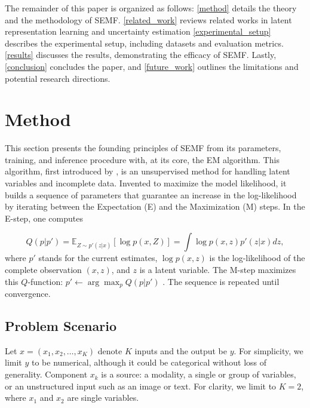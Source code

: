 \documentclass{article}
\begin{document}
The remainder of this paper is organized as follows: \autoref{method} details the theory and the methodology of SEMF. \autoref{related_work} reviews related works in latent representation learning and uncertainty estimation
\autoref{experimental_setup} describes the experimental setup, including datasets and evaluation metrics. \autoref{results} discusses the results, demonstrating the efficacy of SEMF. Lastly, \autoref{conclusion} concludes the paper, and \autoref{future_work} outlines the limitations and potential research directions.

\section{Method}
\label{method}
This section presents the founding principles of SEMF from its parameters, training, and inference procedure with, at its core, the EM algorithm. This algorithm, first introduced by \cite{Dempster1977}, is an unsupervised method for handling latent variables and incomplete data. Invented to maximize the model likelihood, it builds a sequence of parameters that guarantee an increase in the log-likelihood \cite{wu1983convergence} by iterating between the Expectation (E) and the Maximization (M) steps. In the E-step, one computes

\begin{equation}
\label{eqn:em_e_step}
Q(p | p') = \mathbb{E}_{Z \sim p'(z| x)}\left[ \log p(x, Z) \right] = \int \log p(x,z) p'(z|x) dz,
\end{equation}
where \( p' \) stands for the current estimates, \( \log p(x, z) \) is the log-likelihood of the complete observation $(x,z)$, and \( z \) is a latent variable. The M-step maximizes this $Q$-function: $p' \leftarrow \arg\max_p Q(p | p')$ . The sequence is repeated until convergence.

\subsection{Problem Scenario}
Let $x=(x_1, x_2, \ldots, x_K)$ denote $K$ inputs and the output be $y$. For simplicity, we limit $y$ to be numerical, although it could be categorical without loss of generality. Component $x_k$ is a source: a modality, a single or group of variables, or an unstructured input such as an image or text. For clarity, we limit to $K=2$, where $x_1$ and $x_2$ are single variables.
\end{document}
